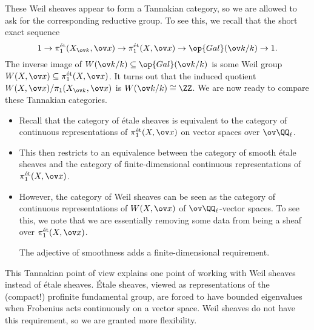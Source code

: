 \documentclass[../notes.tex]{subfiles}
\begin{document}
These Weil sheaves appear to form a Tannakian category, so we are allowed to ask for the corresponding reductive group. To see this, we recall that the short exact sequence
\[1\to\pi_1^{\mathrm{\acute et}}(X_{\ov k},\ov x)\to\pi_1^{\mathrm{\acute et}}(X,\ov x)\to\op{Gal}(\ov k/k)\to1.\]
The inverse image of $W(\ov k/k)\subseteq\op{Gal}(\ov k/k)$ is some Weil group $W(X,\ov x)\subseteq\pi_1^{\mathrm{\acute et}}(X,\ov x)$. It turns out that the induced quotient $W(X,\ov x)/\pi_1(X_{\ov k},\ov x)$ is $W(\ov k/k)\cong\ZZ$. We are now ready to compare these Tannakian categories.
\begin{itemize}
	\item Recall that the category of \'etale sheaves is equivalent to the category of continuous representations of $\pi_1^{\mathrm{\acute et}}(X,\ov x)$ on vector spaces over $\ov\QQ_\ell$.
	\item This then restricts to an equivalence between the category of smooth \'etale sheaves and the category of finite-dimensional continuous representations of $\pi_1^{\mathrm{\acute et}}(X,\ov x)$.
	\item However, the category of Weil sheaves can be seen as the category of continuous representations of $W(X,\ov x)$ of $\ov\QQ_\ell$-vector spaces. To see this, we note that we are essentially removing some data from being a sheaf over $\pi_1^{\mathrm{\acute et}}(X,\ov x)$.

	The adjective of smoothness adds a finite-dimensional requirement.
\end{itemize}
\begin{remark}
	This Tannakian point of view explains one point of working with Weil sheaves instead of \'etale sheaves. \'Etale sheaves, viewed as representations of the (compact!) profinite fundamental group, are forced to have bounded eigenvalues when Frobenius acts continuously on a vector space. Weil sheaves do not have this requirement, so we are granted more flexibility.
\end{remark}
\end{document}
